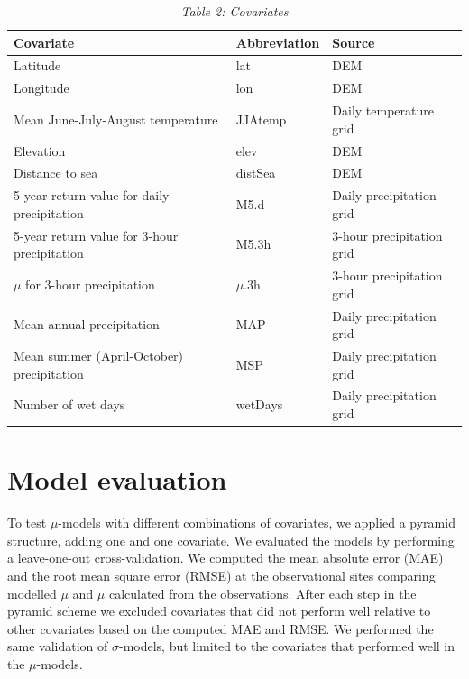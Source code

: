 \documentclass[12pt,a4paper,english]{article}
\begin{document}
\clearpage

\begin{singlespace}
\begin{table}[hbtp]
\caption*{\sl Table 2: Covariates}
\centering
  \begin{tabular}{|l|l|l|}
    \hline
    \hline
    \textbf{Covariate} & \textbf{Abbreviation} & \textbf{Source}\\
	\hline
	\hline
	Latitude & lat & DEM\\
	\hline
	Longitude & lon & DEM\\
	\hline
	Mean June-July-August temperature & JJAtemp & Daily temperature grid\\
	\hline
	Elevation & elev & DEM\\
	\hline
	Distance to sea & distSea & DEM\\
	\hline
	5-year return value for daily precipitation & M5.d & Daily precipitation grid\\
	\hline
	5-year return value for 3-hour precipitation & M5.3h & 3-hour precipitation grid\\
	\hline
	$\mu$ for 3-hour precipitation & $\mu$.3h & 3-hour precipitation grid\\
	\hline
	Mean annual precipitation & MAP & Daily precipitation grid\\
	\hline
	Mean summer (April-October) precipitation & MSP & Daily precipitation grid\\
	\hline
	Number of wet days & wetDays & Daily precipitation grid\\
   \hline
   \hline
\end{tabular}
\end{table}
\end{singlespace}

\section{Model evaluation}

To test $\mu$-models with different combinations of covariates, we applied a pyramid structure, adding one and one covariate. We evaluated the models by performing a leave-one-out cross-validation. We computed the mean absolute error (MAE) and the root mean square error (RMSE) at the observational sites comparing modelled $\mu$ and $\mu$ calculated from the observations. After each step in the pyramid scheme we excluded covariates that did not perform well relative to other covariates based on the computed MAE and RMSE. We performed the same validation of $\sigma$-models, but limited to the covariates that performed well in the $\mu$-models.
\end{document}
